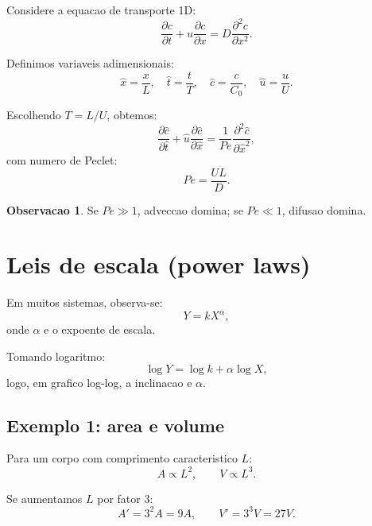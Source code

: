 \documentclass[12pt,a4paper,oneside]{book}
\theoremstyle{definition}
\newtheorem{remark}[definition]{Observacao}
\begin{document}
Considere a equacao de transporte 1D:
\begin{equation}
\frac{\partial c}{\partial t} + u\frac{\partial c}{\partial x} = D\frac{\partial^2 c}{\partial x^2}.
\end{equation}

Definimos variaveis adimensionais:
\begin{equation}
\hat{x} = \frac{x}{L}, \quad \hat{t} = \frac{t}{T}, \quad \hat{c} = \frac{c}{C_0}, \quad \hat{u} = \frac{u}{U}.
\end{equation}

Escolhendo $T=L/U$, obtemos:
\begin{equation}
\frac{\partial \hat{c}}{\partial \hat{t}} + \hat{u}\frac{\partial \hat{c}}{\partial \hat{x}} = \frac{1}{Pe}\frac{\partial^2 \hat{c}}{\partial \hat{x}^2},
\end{equation}
com numero de Peclet:
\begin{equation}
Pe = \frac{UL}{D}.
\end{equation}

\begin{remark}
Se $Pe \gg 1$, adveccao domina; se $Pe \ll 1$, difusao domina.
\end{remark}

\section{Leis de escala (power laws)}

Em muitos sistemas, observa-se:
\begin{equation}
Y = kX^\alpha,
\end{equation}
onde $\alpha$ e o expoente de escala.

Tomando logaritmo:
\begin{equation}
\log Y = \log k + \alpha \log X,
\end{equation}
logo, em grafico log-log, a inclinacao e $\alpha$.

\subsection{Exemplo 1: area e volume}

Para um corpo com comprimento caracteristico $L$:
\begin{equation}
A \propto L^2, \qquad V \propto L^3.
\end{equation}

Se aumentamos $L$ por fator 3:
\begin{equation}
A' = 3^2A = 9A, \qquad V' = 3^3V = 27V.
\end{equation}
\end{document}
